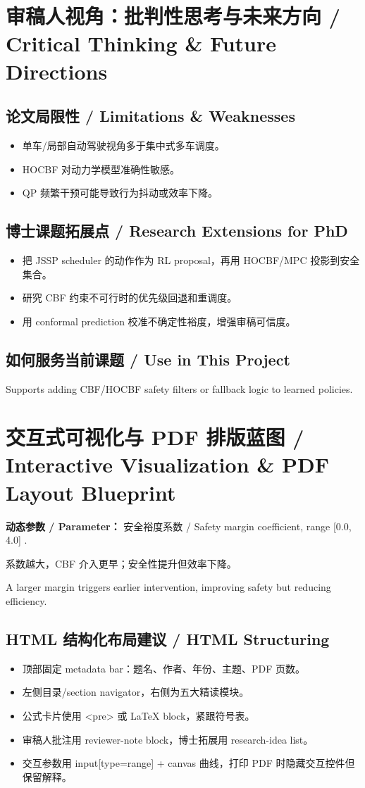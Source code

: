\documentclass[UTF8,a4paper,11pt,fontset=fandol]{ctexart}
\begin{document}
\section{审稿人视角：批判性思考与未来方向 / Critical Thinking \& Future Directions}
\subsection{论文局限性 / Limitations \& Weaknesses}
\begin{itemize}
\item 单车/局部自动驾驶视角多于集中式多车调度。
\item HOCBF 对动力学模型准确性敏感。
\item QP 频繁干预可能导致行为抖动或效率下降。
\end{itemize}


\subsection{博士课题拓展点 / Research Extensions for PhD}
\begin{itemize}
\item 把 JSSP scheduler 的动作作为 RL proposal，再用 HOCBF/MPC 投影到安全集合。
\item 研究 CBF 约束不可行时的优先级回退和重调度。
\item 用 conformal prediction 校准不确定性裕度，增强审稿可信度。
\end{itemize}


\subsection{如何服务当前课题 / Use in This Project}
Supports adding CBF/HOCBF safety filters or fallback logic to learned policies.

\section{交互式可视化与 PDF 排版蓝图 / Interactive Visualization \& PDF Layout Blueprint}
\textbf{动态参数 / Parameter：} 安全裕度系数 / Safety margin coefficient, range [0.0, 4.0] .

系数越大，CBF 介入更早；安全性提升但效率下降。

A larger margin triggers earlier intervention, improving safety but reducing efficiency.

\subsection{HTML 结构化布局建议 / HTML Structuring}
\begin{itemize}
\item 顶部固定 metadata bar：题名、作者、年份、主题、PDF 页数。
\item 左侧目录/section navigator，右侧为五大精读模块。
\item 公式卡片使用 <pre> 或 LaTeX block，紧跟符号表。
\item 审稿人批注用 reviewer-note block，博士拓展用 research-idea list。
\item 交互参数用 input[type=range] + canvas 曲线，打印 PDF 时隐藏交互控件但保留解释。
\end{itemize}
\end{document}
